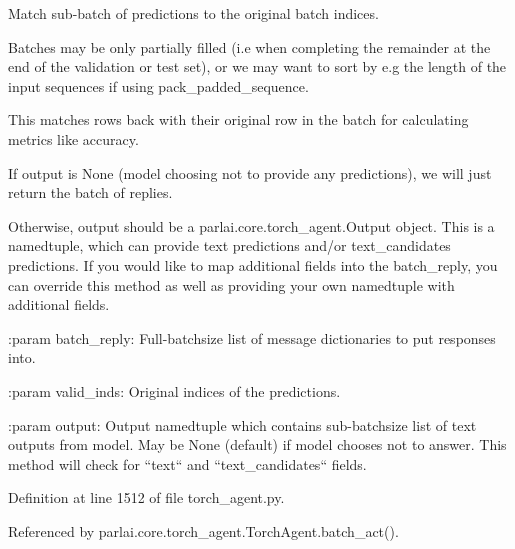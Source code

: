 \begin{DoxyVerb}Match sub-batch of predictions to the original batch indices.

Batches may be only partially filled (i.e when completing the remainder
at the end of the validation or test set), or we may want to sort by
e.g the length of the input sequences if using pack_padded_sequence.

This matches rows back with their original row in the batch for
calculating metrics like accuracy.

If output is None (model choosing not to provide any predictions), we
will just return the batch of replies.

Otherwise, output should be a parlai.core.torch_agent.Output object.
This is a namedtuple, which can provide text predictions and/or
text_candidates predictions. If you would like to map additional
fields into the batch_reply, you can override this method as well as
providing your own namedtuple with additional fields.

:param batch_reply:
    Full-batchsize list of message dictionaries to put responses into.

:param valid_inds:
    Original indices of the predictions.

:param output:
    Output namedtuple which contains sub-batchsize list of text outputs
    from model. May be None (default) if model chooses not to answer.
    This method will check for ``text`` and ``text_candidates`` fields.
\end{DoxyVerb}
 

Definition at line 1512 of file torch\+\_\+agent.\+py.



Referenced by parlai.\+core.\+torch\+\_\+agent.\+Torch\+Agent.\+batch\+\_\+act().

